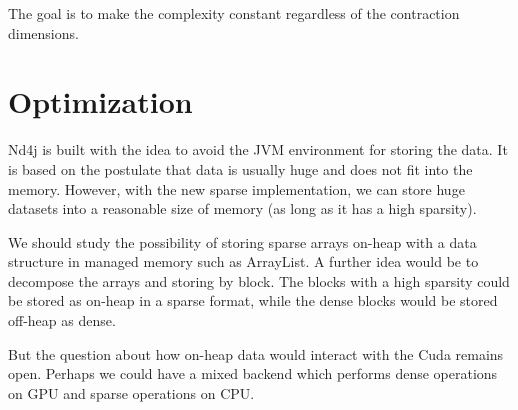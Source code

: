 The goal is to make the complexity constant regardless of the contraction dimensions.


\section{Optimization}
Nd4j is built with the idea to avoid the JVM environment for storing the data. It is based on the postulate that data is usually huge and does not fit into the memory. However, with the new sparse implementation, we can store huge datasets into a reasonable size of memory (as long as it has a high sparsity).

We should study the possibility of storing sparse arrays on-heap with a data structure in managed memory such as ArrayList. A further idea would be to decompose the arrays and storing by block. The blocks with a high sparsity could be stored as on-heap in a sparse format, while the dense blocks would be stored off-heap as dense.

But the question about how on-heap data would interact with the Cuda remains open. Perhaps we could have a mixed backend which performs dense operations on GPU and sparse operations on CPU.